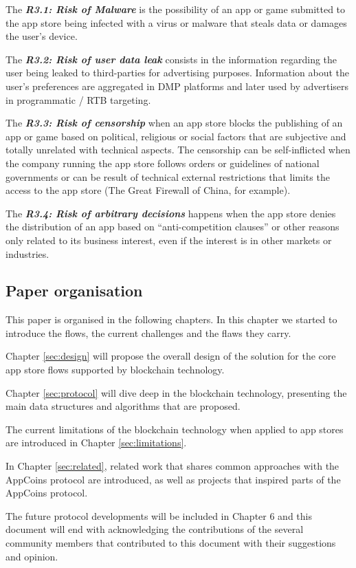 \begin{tcolorbox}[enhanced jigsaw,sharp corners, drop fuzzy shadow=ShadowColor]

The {\bf\em R3.1: Risk of Malware} is the possibility of an app or game submitted to the app store being infected with a virus or malware that steals data or damages the user's device.

The {\bf\em R3.2: Risk of user data leak} consists in the information regarding the user being leaked to third-parties for advertising purposes. Information about the user's preferences are aggregated in DMP platforms and later used by advertisers in programmatic / RTB targeting.


The {\bf\em R3.3: Risk of censorship} when an app store blocks the publishing of an app or game based on political, religious or social factors that are subjective and totally unrelated with technical aspects. The censorship can be self-inflicted when the company running the app store follows orders or guidelines of national governments or can be result of technical external restrictions that limits the access to the app store (The Great Firewall of China, for example).

The {\bf\em R3.4: Risk of arbitrary decisions} happens when the app store denies the distribution of an app based on ``anti-competition clauses'' \cite{PlayTermsService} or other reasons only related to its business interest, even if the interest is in other markets or industries.

\end{tcolorbox}

\subsection{Paper organisation}

This paper is organised in the following chapters. In this chapter we started to introduce the flows, the current challenges and the flaws they carry.

Chapter \ref{sec:design} will propose the overall design of the solution for the core app store flows supported by blockchain technology. 

Chapter \ref{sec:protocol} will dive deep in the blockchain technology, presenting the main data structures and algorithms that are proposed.

The current limitations of the blockchain technology when applied to app stores are introduced in Chapter \ref{sec:limitations}.

In Chapter \ref{sec:related}, related work that shares common approaches with the AppCoins protocol are introduced, as well as projects that inspired parts of the AppCoins protocol.


The future protocol developments will be included in Chapter 6 and this document will end with acknowledging the contributions of the several community members that contributed to this document with their suggestions and opinion.


